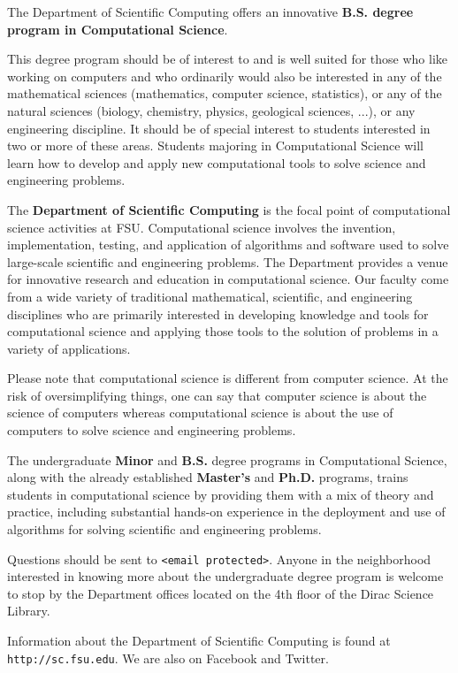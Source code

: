 \documentclass[12pt,a4paper]{article}
\begin{document}
The Department of Scientific Computing offers an innovative \textbf{B.S. degree program in Computational Science}.

This degree program should be of interest to and is well suited for those who like working on computers and who ordinarily would also be interested in any of the mathematical sciences (mathematics, computer science, statistics), or any of the natural sciences (biology, chemistry, physics, geological sciences, ...), or any engineering discipline. It should be of special interest to students interested in two or more of these areas. Students majoring in Computational Science will learn how to develop and apply new computational tools to solve science and engineering problems.

The \textbf{Department of Scientific Computing} is the focal point of computational science activities at FSU. Computational science involves the invention, implementation, testing, and application of algorithms and software used to solve large-scale scientific and engineering problems. The Department provides a venue for innovative research and education in computational science. Our faculty come from a wide variety of traditional mathematical, scientific, and engineering disciplines who are primarily interested in developing knowledge and tools for computational science and applying those tools to the solution of problems in a variety of applications.

Please note that computational science is different from computer science. At the risk of oversimplifying things, one can say that computer science is about the science of computers whereas computational science is about the use of computers to solve science and engineering problems.

The undergraduate \textbf{Minor} and \textbf{B.S.} degree programs in Computational Science, along with the already established \textbf{Master's} and \textbf{Ph.D.} programs, trains students in computational science by providing them with a mix of theory and practice, including substantial hands-on experience in the deployment and use of algorithms for solving scientific and engineering problems.

Questions should be sent to \texttt{<email protected>}. Anyone in the neighborhood interested in knowing more about the undergraduate degree program is welcome to stop by the Department offices located on the 4th floor of the Dirac Science Library.

Information about the Department of Scientific Computing is found at \texttt{http://sc.fsu.edu}. We are also on Facebook and Twitter.
\end{document}
